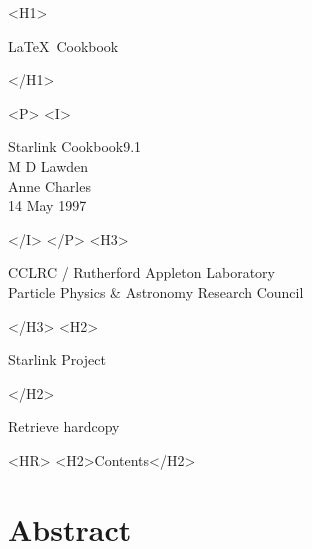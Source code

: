 \documentclass[11pt,twoside]{article}
\newcommand{\stardoccategory}  {Starlink Cookbook}
\newcommand{\stardocsource}    {sc\stardocnumber}
\newcommand{\stardocnumber}    {9.1}
\newcommand{\stardocauthors}   {M D Lawden\\
                                Anne Charles}
\newcommand{\stardocdate}      {14 May 1997}
\newcommand{\stardoctitle}     {\LaTeX\ Cookbook}
\newcommand{\htmladdnormallink}[2]{#1}
\newcommand{\htmladdimg}[1]{}
\newcommand{\htmlref}[2]{#1}
\newcommand{\htmladdtonavigation}[1]{}
\newcommand{\xlabel}[1]{}
\newcommand{\latexonlytoc}[0]{\tableofcontents}
\begin{document}
\begin{htmlonly}
   \xlabel{}
   \begin{rawhtml} <H1> \end{rawhtml}
      \stardoctitle
   \begin{rawhtml} </H1> \end{rawhtml}


   \begin{rawhtml} <P> <I> \end{rawhtml}
   \stardoccategory \stardocnumber \\
   \stardocauthors \\
   \stardocdate
   \begin{rawhtml} </I> </P> <H3> \end{rawhtml}
      \htmladdnormallink{CCLRC}{http://www.cclrc.ac.uk} /
      \htmladdnormallink{Rutherford Appleton Laboratory}
                        {http://www.cclrc.ac.uk/ral} \\
      \htmladdnormallink{Particle Physics \& Astronomy Research Council}
                        {http://www.pparc.ac.uk} \\
   \begin{rawhtml} </H3> <H2> \end{rawhtml}
      \htmladdnormallink{Starlink Project}{http://star-www.rl.ac.uk/}
   \begin{rawhtml} </H2> \end{rawhtml}
   \htmladdnormallink{\htmladdimg{source.gif} Retrieve hardcopy}
      {http://star-www.rl.ac.uk/cgi-bin/hcserver?\stardocsource}\\

  \label{stardoccontents}
  \begin{rawhtml} 
    <HR>
    <H2>Contents</H2>
  \end{rawhtml}
  \renewcommand{\latexonlytoc}[0]{}
  \htmladdtonavigation{\htmlref{\htmladdimg{contents_motif.gif}}
        {stardoccontents}}

  \section{\xlabel{abstract}Abstract}

\end{htmlonly}
\end{document}
